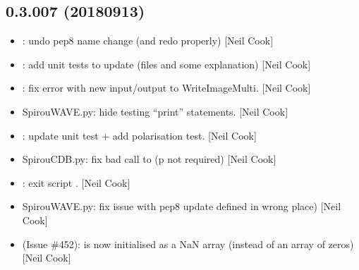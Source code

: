 \documentclass[a4paper,10pt,english]{report}
\begin{document}
\subsection{0.3.007 (2018\sphinxhyphen{}09\sphinxhyphen{}13)}
\label{\detokenize{misc/changelog:id346}}\begin{itemize}
\item {} 
: undo pep8 name change (and redo properly) {[}Neil
Cook{]}

\item {} 
: add unit tests to update (files and some
explanation) {[}Neil Cook{]}

\item {} 
: fix error with new input/output to WriteImageMulti.
{[}Neil Cook{]}

\item {} 
SpirouWAVE.py: hide testing “print” statements. {[}Neil Cook{]}

\item {} 
: update unit test + add polarisation test. {[}Neil Cook{]}

\item {} 
SpirouCDB.py: fix bad call to  (p not required) {[}Neil
Cook{]}

\item {} 
: exit script . {[}Neil Cook{]}

\item {} 
SpirouWAVE.py: fix issue with pep8 update  defined in wrong
place) {[}Neil Cook{]}

\item {} 
 (Issue \#452):  is now initialised as a NaN
array (instead of an array of zeros) {[}Neil Cook{]}

\end{itemize}
\end{document}
